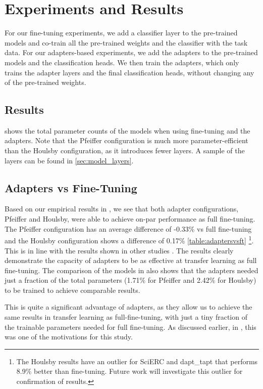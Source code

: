 \documentclass[10pt,twocolumn,letterpaper]{article}
\begin{document}
\section{Experiments and Results}

For our fine-tuning experiments, we add a classifier layer to the pre-trained models and co-train all the pre-trained weights and the classifier with the task data. For our adapters-based experiments, we add the adapters to the pre-trained models and the classification heads. We then train the adapters, which only trains the adapter layers and the final classification heads, without changing any of the pre-trained weights.

\subsection{Results}


 shows the total parameter counts of the models when using fine-tuning and the adapters. Note that the Pfeiffer configuration is much more parameter-efficient than the Houlsby configuration, as it introduces fewer layers. A sample of the layers can be found in \ref{sec:model_layers}.



\subsection{Adapters vs Fine-Tuning} 

Based on our empirical results in , we see that both adapter configurations, Pfeiffer and Houlsby, were able to achieve on-par performance as full fine-tuning. The Pfeiffer configuration has an average difference of -0.33\% vs full fine-tuning and the Houlsby configuration shows a difference of 0.17\% \ref{table:adaptersvsft} \footnote{The Houlsby results have an outlier for SciERC and dapt\_tapt that performs 8.9\% better than fine-tuning. Future work will investigate this outlier for confirmation of results.}. This is in line with the results shown in other studies \cite{houlsby2019parameter}. The results clearly demonstrate the capacity of adapters to be as effective at transfer learning as full fine-tuning. The comparison of the models in  also shows that the adapters needed just a fraction of the total parameters (1.71\% for Pfeiffer and 2.42\% for Houlsby) to be trained to achieve comparable results. 

This is quite a significant advantage of adapters, as they allow us to achieve the same results in transfer learning as full-fine-tuning, with just a tiny fraction of the trainable parameters needed for full fine-tuning. As discussed earlier, in , this was one of the motivations for this study.
\end{document}
